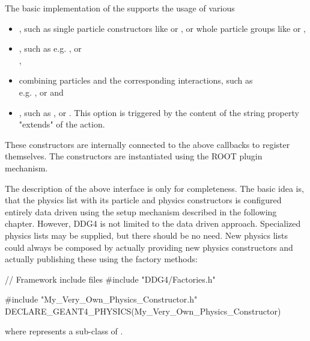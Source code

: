 \documentclass[10pt,a4paper]{article}
\begin{document}
\noindent
The basic implementation of the  supports the usage of various
\begin{itemize}\itemcompact
\item {}, 
    such as single particle constructors like   
     or , or whole particle groups like
     or ,
\item {}, 
    such as e.g. ,
     or\\ , 
\item {} 
    combining particles and the corresponding 
    interactions, such as\\ e.g. ,
     or  and
\item {}, 
    such as ,
     or . This option is triggered by the 
    content of the string property "extends" of the  action.
\end{itemize}
These constructors are internally connected to the above callbacks to register themselves. 
The constructors are instantiated using the ROOT plugin mechanism.

\noindent
The description of the above interface is only for completeness. The basic idea is,
that the physics list with its particle and physics constructors is configured
entirely data driven using the setup mechanism described in the following
chapter. However, DDG4 is not limited to the data driven approach. Specialized 
physics lists may be supplied, but there should be no need.
New physics lists could always be composed by actually providing new physics
constructors and actually publishing these using the factory methods:
\begin{code}
// Framework include files
#include "DDG4/Factories.h"

#include "My_Very_Own_Physics_Constructor.h"
DECLARE_GEANT4_PHYSICS(My_Very_Own_Physics_Constructor)
\end{code}
where  represents a sub-class of
.
\end{document}
